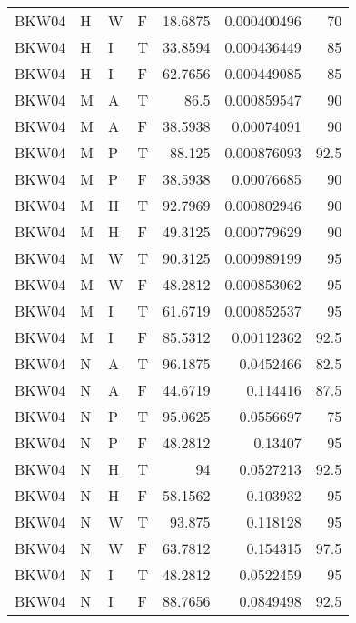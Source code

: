 \begin{table}[!htb]
{\begin{tabular}{llllrrr}
            BKW04    & H     & W     & F          & 18.6875    & 0.000400496 & 70       \\
            BKW04    & H     & I     & T          & 33.8594    & 0.000436449 & 85       \\
            BKW04    & H     & I     & F          & 62.7656    & 0.000449085 & 85       \\
            BKW04    & M     & A     & T          & 86.5       & 0.000859547 & 90       \\
            BKW04    & M     & A     & F          & 38.5938    & 0.00074091  & 90       \\
            BKW04    & M     & P     & T          & 88.125     & 0.000876093 & 92.5     \\
            BKW04    & M     & P     & F          & 38.5938    & 0.00076685  & 90       \\
            BKW04    & M     & H     & T          & 92.7969    & 0.000802946 & 90       \\
            BKW04    & M     & H     & F          & 49.3125    & 0.000779629 & 90       \\
            BKW04    & M     & W     & T          & 90.3125    & 0.000989199 & 95       \\
            BKW04    & M     & W     & F          & 48.2812    & 0.000853062 & 95       \\
            BKW04    & M     & I     & T          & 61.6719    & 0.000852537 & 95       \\
            BKW04    & M     & I     & F          & 85.5312    & 0.00112362  & 92.5     \\
            BKW04    & N     & A     & T          & 96.1875    & 0.0452466   & 82.5     \\
            BKW04    & N     & A     & F          & 44.6719    & 0.114416    & 87.5     \\
            BKW04    & N     & P     & T          & 95.0625    & 0.0556697   & 75       \\
            BKW04    & N     & P     & F          & 48.2812    & 0.13407     & 95       \\
            BKW04    & N     & H     & T          & 94         & 0.0527213   & 92.5     \\
            BKW04    & N     & H     & F          & 58.1562    & 0.103932    & 95       \\
            BKW04    & N     & W     & T          & 93.875     & 0.118128    & 95       \\
            BKW04    & N     & W     & F          & 63.7812    & 0.154315    & 97.5     \\
            BKW04    & N     & I     & T          & 48.2812    & 0.0522459   & 95       \\
            BKW04    & N     & I     & F          & 88.7656    & 0.0849498   & 92.5     \\
            \hline
        \end{tabular}
    }{}
\end{table}